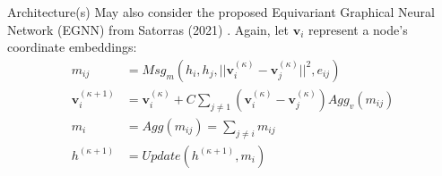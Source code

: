 \documentclass{beamer}
\newcommand{\node}{v}
\newcommand{\nrepresent}{h}
\newcommand{\edge}{e}
\newcommand{\iter}{\kappa}
\begin{document}
\begin{frame}{Architecture(s)}
    May also consider the proposed Equivariant Graphical Neural Network (EGNN) from Satorras (2021) \cite{satorras_en_2022}. Again, let $\mathbf{\node}_i$ represent a node's coordinate embeddings: 
        \begin{align*}
            m_{ij}
            &=
            Msg_m(\nrepresent_i, \nrepresent_j, ||\mathbf{\node}_i^{(\iter)}-\mathbf{\node}_j^{(\iter)}||^2, \edge_{ij}) 
        \\ 
            \mathbf{\node}_i^{(\iter+1)}
            &=
            \mathbf{\node}_i^{(\iter)}
            +
            C
            \sum_{j\neq 1}
            \left(
            \mathbf{\node}_i^{(\iter)}
            -
            \mathbf{\node}_j^{(\iter)}
            \right) 
            Agg_\node(m_{ij})
        \\
            m_i 
            &= 
            Agg(m_{ij})
            =
            \sum_{j\neq i} m_{ij}
        \\
            \nrepresent^{(\iter+1)}
            &=
            Update(\nrepresent^{(\iter+1)}, m_i)
        \end{align*}
    
\end{frame}
\end{document}
